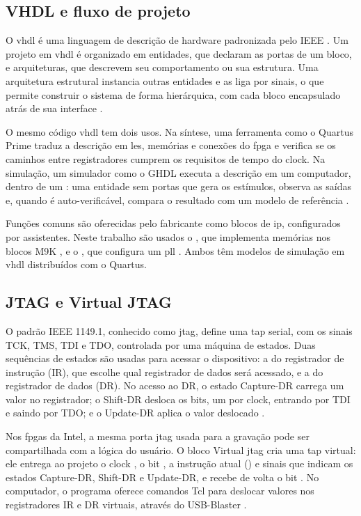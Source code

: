\subsection{VHDL e fluxo de projeto}

O \ac{vhdl} é uma linguagem de descrição de hardware padronizada pelo IEEE \cite{ieee2009vhdl}. Um projeto em \ac{vhdl} é organizado em entidades, que declaram as portas de um bloco, e arquiteturas, que descrevem seu comportamento ou sua estrutura. Uma arquitetura estrutural instancia outras entidades e as liga por sinais, o que permite construir o sistema de forma hierárquica, com cada bloco encapsulado atrás de sua interface \cite{pedroni2010}.

O mesmo código \ac{vhdl} tem dois usos. Na síntese, uma ferramenta como o Quartus Prime traduz a descrição em \acp{le}, memórias e conexões do \ac{fpga} e verifica se os caminhos entre registradores cumprem os requisitos de tempo do clock. Na simulação, um simulador como o GHDL executa a descrição em um computador, dentro de um : uma entidade sem portas que gera os estímulos, observa as saídas e, quando é auto-verificável, compara o resultado com um modelo de referência \cites{pedroni2010,ghdl2025}.

Funções comuns são oferecidas pelo fabricante como blocos de \ac{ip}, configurados por assistentes. Neste trabalho são usados o , que implementa memórias nos blocos M9K \cite{intel2018ram}, e o , que configura um \ac{pll} \cite{intel2017pll}. Ambos têm modelos de simulação em \ac{vhdl} distribuídos com o Quartus.

\subsection{JTAG e Virtual JTAG}

O padrão IEEE 1149.1, conhecido como \ac{jtag}, define uma \ac{tap} serial, com os sinais TCK, TMS, TDI e TDO, controlada por uma máquina de estados. Duas sequências de estados são usadas para acessar o dispositivo: a do registrador de instrução (IR), que escolhe qual registrador de dados será acessado, e a do registrador de dados (DR). No acesso ao DR, o estado Capture-DR carrega um valor no registrador; o Shift-DR desloca os bits, um por clock, entrando por TDI e saindo por TDO; e o Update-DR aplica o valor deslocado \cite{ieee2013jtag}.

Nos \acp{fpga} da Intel, a mesma porta \ac{jtag} usada para a gravação pode ser compartilhada com a lógica do usuário. O bloco Virtual \ac{jtag} cria uma \ac{tap} virtual: ele entrega ao projeto o clock , o bit , a instrução atual () e sinais que indicam os estados Capture-DR, Shift-DR e Update-DR, e recebe de volta o bit . No computador, o programa  oferece comandos Tcl para deslocar valores nos registradores IR e DR virtuais, através do USB-Blaster \cite{intel2018vjtag}.

